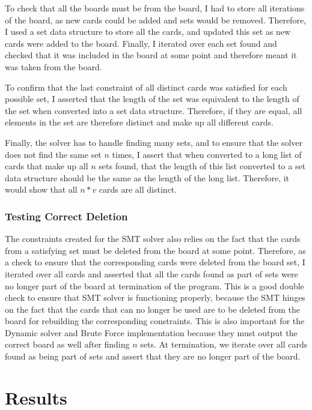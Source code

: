 \documentclass[pageno]{jpaper}
\begin{document}
To check that all the boards must be from the board, I had to store all iterations of the board, as new cards could be added and sets would be removed. Therefore, I used a set data structure to store all the cards, and updated this set as new cards were added to the board. Finally, I iterated over each set found and checked that it was included in the board at some point and therefore meant it was taken from the board. 

To confirm that the last constraint of all distinct cards was satisfied for each possible set, I asserted that the length of the set was equivalent to the length of the set when converted into a set data structure. Therefore, if they are equal, all elements in the set are therefore distinct and make up all different cards.

Finally, the solver has to handle finding many sets, and to ensure that the solver does not find the same set $n$ times, I assert that when converted to a long list of cards that make up all $n$ sets found, that the length of this list converted to a set data structure should be the same as the length of the long list. Therefore, it would show that all $n*v$ cards are all distinct. 

\subsubsection{Testing Correct Deletion}

The constraints created for the SMT solver also relies on the fact that the cards from a satisfying set must be deleted from the board at some point. Therefore, as a check to ensure that the corresponding cards were deleted from the board set, I iterated over all cards and asserted that all the cards found as part of sets were no longer part of the board at termination of the program. This is a good double check to ensure that SMT solver is functioning properly, because the SMT hinges on the fact that the cards that can no longer be used are to be deleted from the board for rebuilding the corresponding constraints. This is also important for the Dynamic solver and Brute Force implementation because they must output the correct board as well after finding $n$ sets. At termination, we iterate over all cards found as being part of sets and assert that they are no longer part of the board.


\section{Results}
\end{document}
